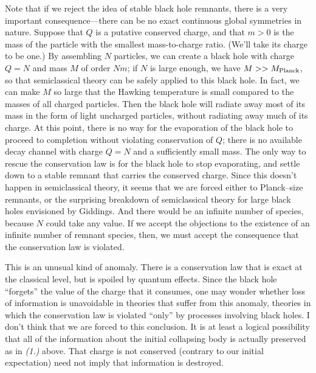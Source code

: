 Note that if we reject the idea of stable black hole remnants, there is a very
important consequence---there can be no exact continuous global symmetries in
nature.\lref{}\lref{}\lref{} Suppose that $Q$ is a putative
conserved charge, and that $m>0$ is the
mass of the particle with the smallest mass-to-charge ratio.  (We'll
take its charge to be one.)  By assembling $N$ particles, we can create
a black hole with charge $Q=N$ and mass $M$ of order $Nm$; if $N$ is
large enough, we have $M>>M_{\rm Planck}$, so that semiclassical theory
can be safely applied to this black hole.  In fact, we can make $M$ so
large that the Hawking temperature is small compared to the masses of
all charged particles.  Then the black hole will radiate away most of
its mass in the form of light uncharged particles, without radiating
away much of its charge.  At this point, there is no way for the
evaporation of the black hole to proceed to completion without violating
conservation of $Q$; there is no available decay channel with charge
$Q=N$ and a sufficiently small mass.  The only way to rescue the
conservation law is for the black hole to stop evaporating, and settle
down to a stable remnant that carries the conserved charge.  Since this
doesn't happen in semiclassical theory, it seems that we are forced
either to Planck--size remnants, or the surprising breakdown of
semiclassical theory for large black holes envisioned by Giddings.  And
there would be an infinite number of species, because $N$ could take any
value.  If we accept the objections to the existence of an infinite
number of remnant species, then, we must accept the consequence that the
conservation law is violated.

This is an unusual kind of anomaly.  There is a conservation law that is exact
at the
classical level, but is spoiled by quantum effects.  Since the black hole
``forgets'' the value of the charge that it consumes, one may wonder whether
loss of information is unavoidable in theories that suffer from this anomaly,
theories in which the conservation law is violated ``only'' by processes
involving black holes.  I don't think that we are forced to this conclusion.
It is at least a logical possibility that
all of the information about the initial collapsing body is actually preserved
as in {\it (1.)} above.  That charge is not conserved (contrary to our initial
expectation) need not imply that information is destroyed.

